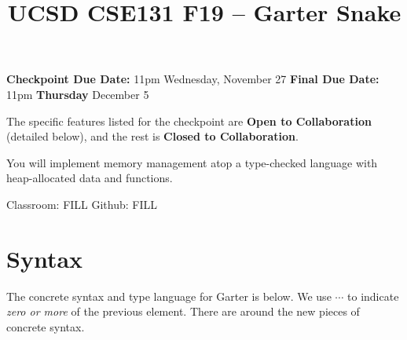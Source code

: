 \documentclass[10pt, oneside]{article}
\title{UCSD CSE131 F19 -- Garter Snake}
\begin{document}
\maketitle 

{\bf Checkpoint Due Date:} 11pm Wednesday, November 27 \hspace{2em} {\bf Final Due Date:} 11pm {\bf Thursday} December 5

The specific features listed for the checkpoint are {\bf Open to
Collaboration} (detailed below), and the rest is {\bf Closed to
Collaboration}.

You will implement memory management atop a type-checked language with
heap-allocated data and functions.

Classroom: FILL \hspace{1em} Github: FILL

\section*{Syntax}

The concrete syntax and type language for Garter is below. We use $\cdots$ to
indicate \textit{zero or more} of the previous element. There are
 around the new pieces of concrete syntax.
\end{document}
